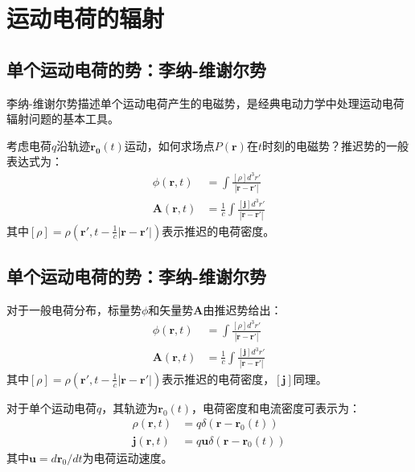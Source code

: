 \section{运动电荷的辐射}
\subsection{单个运动电荷的势：李纳-维谢尔势}

\begin{definition}[李纳-维谢尔势]
李纳-维谢尔势描述单个运动电荷产生的电磁势，是经典电动力学中处理运动电荷辐射问题的基本工具。
\end{definition}

考虑电荷$q$沿轨迹$\boldsymbol{r_0}(t)$运动，如何求场点$P(\mathbf{r})$在$t$时刻的电磁势？推迟势的一般表达式为：
\begin{align}
\phi(\mathbf{r},t) &= \int \frac{[\rho]d^3r'}{|\mathbf{r}-\mathbf{r}'|} \\
\mathbf{A}(\mathbf{r},t) &= \frac{1}{c}\int \frac{[\mathbf{j}]d^3r'}{|\mathbf{r}-\mathbf{r}'|}
\end{align}
其中$[\rho] = \rho(\mathbf{r}',t-\frac{1}{c}|\mathbf{r}-\mathbf{r}'|)$表示推迟的电荷密度。

\subsection{单个运动电荷的势：李纳-维谢尔势}

\begin{definition}[推迟势]
对于一般电荷分布，标量势$\phi$和矢量势$\mathbf{A}$由推迟势给出：
\begin{align}
\phi(\mathbf{r},t) &= \int \frac{[\rho]d^3r'}{|\mathbf{r}-\mathbf{r}'|} \\
\mathbf{A}(\mathbf{r},t) &= \frac{1}{c}\int \frac{[\mathbf{j}]d^3r'}{|\mathbf{r}-\mathbf{r}'|}
\end{align}
其中$[\rho] = \rho(\mathbf{r}',t-\frac{1}{c}|\mathbf{r}-\mathbf{r}'|)$表示推迟的电荷密度，$[\mathbf{j}]$同理。
\end{definition}

对于单个运动电荷$q$，其轨迹为$\mathbf{r}_0(t)$，电荷密度和电流密度可表示为：
\begin{align}
\rho(\mathbf{r},t) &= q\delta(\mathbf{r}-\mathbf{r}_0(t)) \\
\mathbf{j}(\mathbf{r},t) &= q\mathbf{u}\delta(\mathbf{r}-\mathbf{r}_0(t))
\end{align}
其中$\mathbf{u} = d\mathbf{r}_0/dt$为电荷运动速度。

